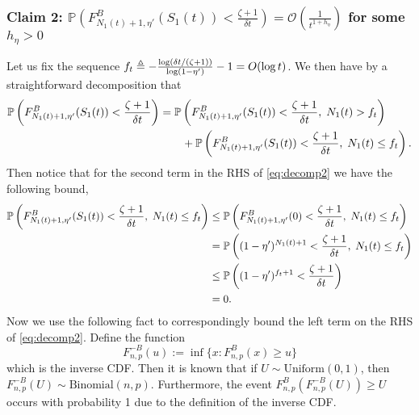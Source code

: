 \begin{myproof}[Proof.]
	\subsubsection*{Claim 2: $\mathbb{P}\left(F^B_{N_1(t)+1, \eta'}(S_1(t)) < \frac{\zeta + 1}{\delta t}\right) = \mathcal{O}\left(\frac{1}{t^{1 + h_\eta}}\right)$ for some $h_\eta > 0$}
	Let us fix the sequence $f_t \defeq -\frac{\log (\delta t/(\zeta+1)) }{\log (1-\eta')}-1 = O(\log t)$. We then have by a straightforward decomposition that
	\begin{align}
	\P{F^B_{N_1(t)+1, \eta'}(S_1(t)) < \frac{\zeta + 1}{\delta t}} & = \P{F^B_{N_1(t)+1, \eta'}(S_1(t)) < \frac{\zeta + 1}{\delta t}, \; N_1(t) > f_t}  \nonumber \\
	& \qquad + \P{F^B_{N_1(t)+1, \eta'}(S_1(t)) < \frac{\zeta + 1}{\delta t}, \; N_1(t) \le f_t} \label{eq:decomp2}.
	\end{align}
	Then notice that for the second term in the RHS of \eqref{eq:decomp2} we have the following bound,
	\begin{align}
	\P{F^B_{N_1(t)+1, \eta'}(S_1(t)) < \frac{\zeta + 1}{\delta t}, \; N_1(t) \le f_t}  &  \le \P{F^B_{N_1(t)+1,\eta'}(0) < \frac{\zeta + 1}{\delta  t}, \; N_1(t) \le f_t} \nonumber \\
	& = \P{(1-\eta')^{N_1(t)+1} <  \frac{\zeta + 1}{\delta  t}, \; N_1(t) \le f_t} \nonumber \\
	& \le \P{(1-\eta')^{f_t+1} <  \frac{\zeta + 1}{\delta  t}} \nonumber \\
	& = 0. \label{bound:bdd_by_zero}
	\end{align}
	Now we use the following fact to correspondingly bound the left term on the RHS of \eqref{eq:decomp2}. Define the function
	\[
	F^{-B}_{n,p}(u) := \inf\{x : F^B_{n,p}(x) \ge u\}
	\]
	which is the inverse CDF. Then it is known that if $U \sim \text{Uniform}(0,1)$, then $F^{-B}_{n,p}(U) \sim \text{Binomial}(n,p)$. Furthermore, the event $F^B_{n,p}(F^{-B}_{n,p}(U)) \ge U$ occurs with probability 1 due to the definition of the inverse CDF.
	

\end{myproof}
